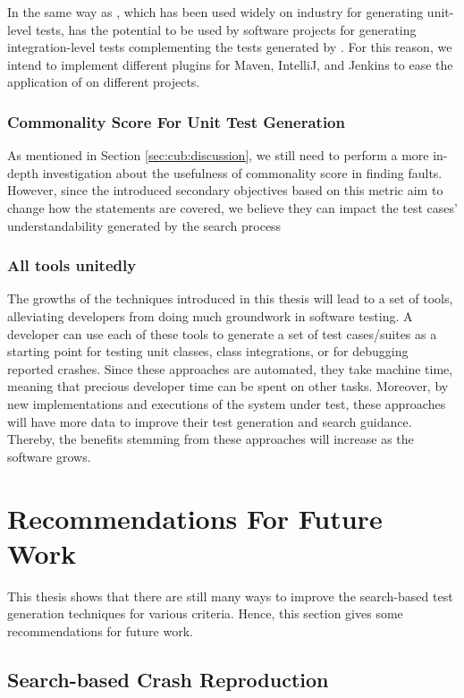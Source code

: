 In the same way as \evosuite, which has been used widely on industry \cite{almasi2017industrial} for generating unit-level tests, \cling has the potential to be used by software projects for generating integration-level tests complementing the tests generated by \evosuite. For this reason, we intend to implement different plugins for Maven, IntelliJ, and Jenkins to ease the application of \cling on different projects.

\subsubsection{Commonality Score For Unit Test Generation}
As mentioned in Section \ref{sec:cub:discussion}, we still need to perform a more in-depth investigation about the usefulness of commonality score in finding faults. However, since the introduced secondary objectives based on this metric aim to change how the statements are covered, we believe they can impact the test cases' understandability generated by the search process


\subsubsection{All tools unitedly}
The growths of the techniques introduced in this thesis will lead to a set of tools, alleviating developers from doing much groundwork in software testing. A developer can use each of these tools to generate a set of test cases/suites as a starting point for testing unit classes, class integrations, or for debugging reported crashes. Since these approaches are automated, they take machine time, meaning that precious developer time can be spent on other tasks.  
Moreover, by new implementations and executions of the system under test, these approaches will have more data to improve their test generation and search guidance. Thereby, the benefits stemming from these approaches will increase as the software grows.

\section{Recommendations For Future Work}
This thesis shows that there are still many ways to improve the search-based test generation techniques for various criteria. Hence, this section gives some recommendations for future work.
\subsection{Search-based Crash Reproduction}

